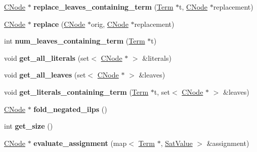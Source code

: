 \begin{DoxyCompactItemize}
\item 
\hypertarget{classCNode_af1397150f71cdaeb70178322fdbb668f}{\hyperlink{classCNode}{\-C\-Node} $\ast$ {\bfseries replace\-\_\-leaves\-\_\-containing\-\_\-term} (\hyperlink{classTerm}{\-Term} $\ast$t, \hyperlink{classCNode}{\-C\-Node} $\ast$replacement)}\label{classCNode_af1397150f71cdaeb70178322fdbb668f}

\item 
\hypertarget{classCNode_a515775fb290af1c3592e607caa57641a}{\hyperlink{classCNode}{\-C\-Node} $\ast$ {\bfseries replace} (\hyperlink{classCNode}{\-C\-Node} $\ast$orig, \hyperlink{classCNode}{\-C\-Node} $\ast$replacement)}\label{classCNode_a515775fb290af1c3592e607caa57641a}

\item 
\hypertarget{classCNode_a91b43fd7e7aea2c5b0f05aece82b97d1}{int {\bfseries num\-\_\-leaves\-\_\-containing\-\_\-term} (\hyperlink{classTerm}{\-Term} $\ast$t)}\label{classCNode_a91b43fd7e7aea2c5b0f05aece82b97d1}

\item 
\hypertarget{classCNode_ab76c3b160eaf38f42660f9b7c58d075c}{void {\bfseries get\-\_\-all\-\_\-literals} (set$<$ \hyperlink{classCNode}{\-C\-Node} $\ast$ $>$ \&literals)}\label{classCNode_ab76c3b160eaf38f42660f9b7c58d075c}

\item 
\hypertarget{classCNode_afca74e7e830916abcc11e16c71a6f38e}{void {\bfseries get\-\_\-all\-\_\-leaves} (set$<$ \hyperlink{classCNode}{\-C\-Node} $\ast$ $>$ \&leaves)}\label{classCNode_afca74e7e830916abcc11e16c71a6f38e}

\item 
\hypertarget{classCNode_aa8f4b9b400fc9d2c5db0d81e63541522}{void {\bfseries get\-\_\-literals\-\_\-containing\-\_\-term} (\hyperlink{classTerm}{\-Term} $\ast$t, set$<$ \hyperlink{classCNode}{\-C\-Node} $\ast$ $>$ \&leaves)}\label{classCNode_aa8f4b9b400fc9d2c5db0d81e63541522}

\item 
\hypertarget{classCNode_ab4aff7ed0f90db7af3a89f37fd8f0c55}{\hyperlink{classCNode}{\-C\-Node} $\ast$ {\bfseries fold\-\_\-negated\-\_\-ilps} ()}\label{classCNode_ab4aff7ed0f90db7af3a89f37fd8f0c55}

\item 
\hypertarget{classCNode_ab1bdf2d02417c0e468cf30ba73c9fe4a}{int {\bfseries get\-\_\-size} ()}\label{classCNode_ab1bdf2d02417c0e468cf30ba73c9fe4a}

\item 
\hypertarget{classCNode_ab333c2f0b29753e4f627ce5576d317e0}{\hyperlink{classCNode}{\-C\-Node} $\ast$ {\bfseries evaluate\-\_\-assignment} (map$<$ \hyperlink{classTerm}{\-Term} $\ast$, \hyperlink{classSatValue}{\-Sat\-Value} $>$ \&assignment)}\label{classCNode_ab333c2f0b29753e4f627ce5576d317e0}


\end{DoxyCompactItemize}
